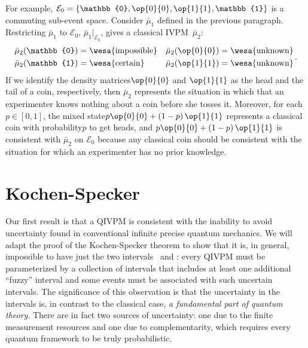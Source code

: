 \documentclass[english,reprint, aps, prl,superscriptaddress, showpacs,
showkeys, longbibliography, amsmath, amssymb]{revtex4-1}
\theoremstyle{plain}
\theoremstyle{definition}
\newcommand{\events}{\ensuremath{\mathcal{E}}}
\newcommand{\imposs}{{\text{\wesa{impossible}}}}
\newcommand{\necess}{{\text{\wesa{certain}}}}
\newcommand{\unknown}{{\text{\wesa{unknown}}}}
\newcommand{\proj}[1]{\op{#1}{#1}}
\newcommand{\nb}{\nolinebreak[1] }
\begin{document}
For example, $\events_{0}=\left\{ \mathbb{0},\proj{0},\proj{1},\mathbb{1}\right\} $
is a commuting sub-event space. Consider $\bar{\mu}_{1}$ defined
in the previous paragraph. Restricting $\bar{\mu}_{1}$ to
$\events_{0}$, $\bar{\mu}_{1}|_{\events_{0}}$, gives a classical
IVPM~$\bar{\mu}_{2}$:
\begin{equation}
\begin{aligned}\bar{\mu}_{2}(\mathbb{0}) & =\imposs & \bar{\mu}_{2}(\proj{0}) & =\unknown\\
\bar{\mu}_{2}(\mathbb{1}) & =\necess & \bar{\mu}_{2}(\proj{1}) & =\unknown
\end{aligned}
\,.
\end{equation}
If we identify the density matrices\nb$\proj{0}$ and $\proj{1}$ as
the head and the tail of a coin, respectively, then $\bar{\mu}_{2}$
represents the situation in which that an experimenter knows nothing about a
coin before she tosses it. Moreover, for each $p\in\left[0,1\right]$, the mixed
state\nb$p\proj{0}+\left(1-p\right)\proj{1}$ represents a classical
coin with probability\nb$p$ to get heads, and
$p\proj{0}+\left(1-p\right)\proj{1}$ is consistent with $\bar{\mu}_{2}$ on $\events_{0}$ because any
classical coin should be consistent with the situation for which an experimenter
has no prior knowledge.

\section{Kochen-Specker} 
  \label{sec:Kochen-Specker}
  
Our first result is that a QIVPM is consistent with the inability to avoid
uncertainty found in conventional infinite precise quantum
mechanics\nb\cite{PeresRon1988,peres1995quantum}. We will adapt
the proof of the Kochen-Specker theorem\nb\cite{kochenspecker1967,
  peres1995quantum,Redhead1987-REDINA,Griffiths2003} to show that it
is, in general, impossible to have just the two intervals \imposs\ and
\necess: every QIVPM must be parameterized by a collection of
intervals that includes at least one additional ``fuzzy'' interval and
some events must be associated with such uncertain intervals. The
significance of this observation is that the uncertainty in the
intervals is, in contrast to the classical case, \emph{a fundamental
  part of quantum theory}. There are in fact two sources of
uncertainty: one due to the finite measurement resources and one due
to complementarity, which requires every quantum framework to be truly
probabilistic.
\end{document}
